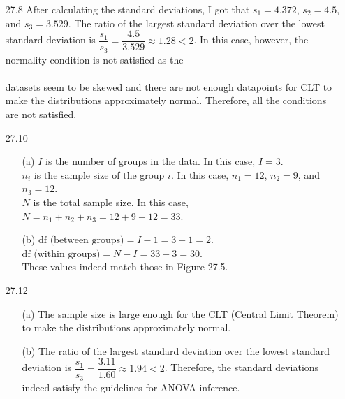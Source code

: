 \documentclass[11pt, a4paper]{article}
\begin{document}
\begin{itemize}
\item[]
\item[]

\item[27.8]
After calculating the standard deviations, I got that
$s_1 = 4.372$, $s_2 = 4.5$, and $s_3 = 3.529$.
The ratio of the largest standard deviation over the lowest
standard deviation is $\dfrac{s_1}{s_3} = \dfrac{4.5}{3.529} \approx 1.28 < 2$.
In this case, however, the normality condition is not satisfied
as the\\\\
datasets seem to be skewed and there are not enough datapoints for CLT to make
the distributions approximately normal. Therefore, all the conditions are not satisfied.

\newpage

\item[27.10]
\begin{itemize}
\item[(a)]
$I$ is the number of groups in the data. In this case, $I = 3$.\\
$n_i$ is the sample size of the group $i$. In this case, $n_1 = 12$, $n_2 = 9$, and $n_3 = 12$.\\
$N$ is the total sample size. In this case, $N = n_1 + n_2 + n_3 = 12 + 9 + 12 = 33$.
\item[]

\item[(b)]
$\text{df (between groups)} = I - 1 = 3 - 1 = 2$.\\
$\text{df (within groups)} = N - I = 33 - 3 = 30$.\\
These values indeed match those in Figure 27.5.
\end{itemize}

\item[]
\item[]

\item[27.12]
\begin{itemize}
\item[(a)]
The sample size is large enough for the CLT (Central Limit Theorem)
to make the distributions approximately normal.

\item[]

\item[(b)]
The ratio of the largest standard deviation over the lowest
standard deviation is $\dfrac{s_1}{s_3} = \dfrac{3.11}{1.60} \approx 1.94 < 2$.
Therefore, the standard deviations indeed satisfy the guidelines for ANOVA inference.


\end{itemize}
\end{itemize}
\end{document}

